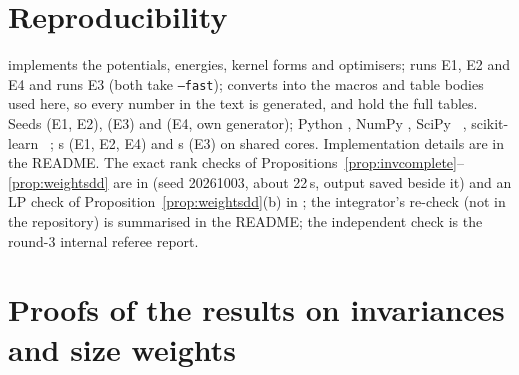 \documentclass[11pt,a4paper]{article}
\theoremstyle{plain}
\theoremstyle{definition}
\theoremstyle{remark}
\begin{document}
\appendix
\section{Reproducibility}\label{app:repro}
{\sloppy {} implements the potentials, energies, kernel forms and optimisers;  runs E1, E2 and E4 and  runs E3 (both take \texttt{--fast});  converts  into the macros and table bodies used here, so every number in the text is generated, and  hold the full tables. Seeds \MetaSeed{} (E1, E2), \MetaSeedRelax{} (E3) and \EfourSeed{} (E4, own generator); Python \MetaPython, NumPy \MetaNumpy, SciPy \MetaScipy~\citep{virtanen2020}, scikit-learn \MetaSklearn~\citep{pedregosa2011}; \IdentitySeconds{} s (E1, E2, E4) and \RelaxSeconds{} s (E3) on shared cores. Implementation details are in the README. The exact rank checks of Propositions~\ref{prop:invcomplete}--\ref{prop:weightsdd} are in  (seed 20261003, about 22\,s, output saved beside it) and an LP check of Proposition~\ref{prop:weightsdd}(b) in ; the integrator's re-check (not in the repository) is summarised in the README; the independent check is the round-3 internal referee report.\par}


\section{Proofs of the results on invariances and size weights}\label{app:proofs}
\end{document}
